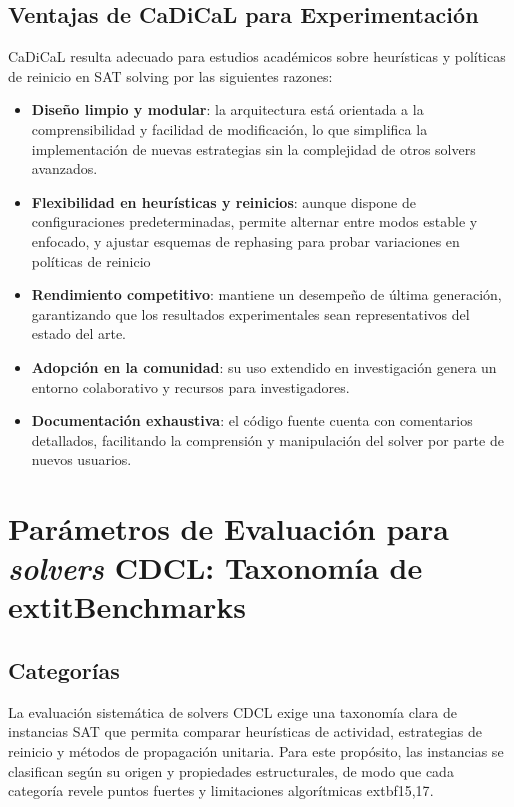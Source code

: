 \subsection{Ventajas de CaDiCaL para Experimentación}
CaDiCaL resulta adecuado para estudios académicos sobre heurísticas y políticas de reinicio en SAT solving por las siguientes razones:
\begin{itemize}
  \item \textbf{Diseño limpio y modular}: la arquitectura está orientada a la comprensibilidad y facilidad de modificación, lo que simplifica la implementación de nuevas estrategias sin la complejidad de otros solvers avanzados.
  \item \textbf{Flexibilidad en heurísticas y reinicios}: aunque dispone de configuraciones predeterminadas, permite alternar entre modos estable y enfocado, y ajustar esquemas de rephasing para probar variaciones en políticas de reinicio %
  \item \textbf{Rendimiento competitivo}: mantiene un desempeño de última generación, garantizando que los resultados experimentales sean representativos del estado del arte.
  \item \textbf{Adopción en la comunidad}: su uso extendido en investigación genera un entorno colaborativo y recursos para investigadores.
  \item \textbf{Documentación exhaustiva}: el código fuente cuenta con comentarios detallados, facilitando la comprensión y manipulación del solver por parte de nuevos usuarios.
\end{itemize}



\section{Parámetros de Evaluación para \textit{solvers} CDCL: Taxonomía de extit{Benchmarks}}
\label{sec:tipos-problemas}
\subsection{Categor\'ias}
\label{subsec:problem-categor}
La evaluación sistemática de solvers CDCL exige una taxonomía clara de instancias SAT que permita comparar heurísticas de actividad, estrategias de reinicio y métodos de propagación unitaria. Para este propósito, las instancias se clasifican según su origen y propiedades estructurales, de modo que cada categoría revele puntos fuertes y limitaciones algorítmicas 	extbf{15,17}.

